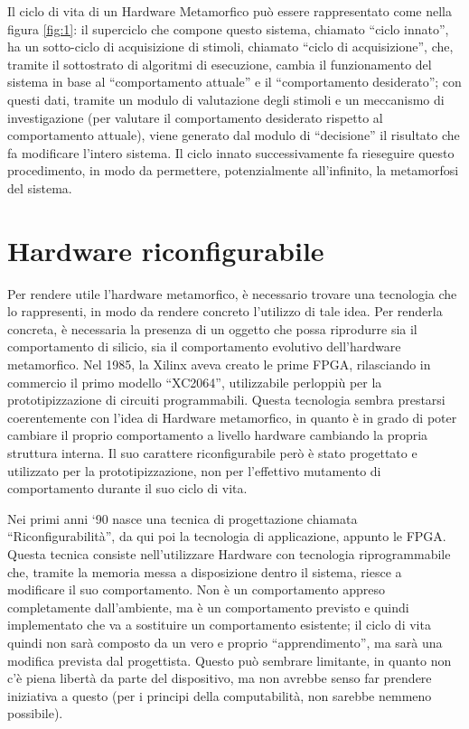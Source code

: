 \documentclass[11pt]{article} %
\begin{document}
Il ciclo di vita di un Hardware Metamorfico può essere rappresentato come nella figura \ref{fig:1}: il superciclo che compone questo sistema, chiamato ``ciclo innato'', ha un sotto-ciclo di acquisizione di stimoli, chiamato ``ciclo di acquisizione'', che, tramite il sottostrato di algoritmi di esecuzione, cambia il funzionamento del sistema in base al ``comportamento attuale'' e il ``comportamento desiderato''; con questi dati, tramite un modulo di valutazione degli stimoli e un meccanismo di investigazione (per valutare il comportamento desiderato rispetto al comportamento attuale), viene generato dal modulo di ``decisione'' il risultato che fa modificare l'intero sistema. Il ciclo innato successivamente fa rieseguire questo procedimento, in modo da permettere, potenzialmente all'infinito, la metamorfosi del sistema.

\section{Hardware riconfigurabile}

Per rendere utile l'hardware metamorfico, è necessario trovare una tecnologia che lo rappresenti, in modo da rendere concreto l'utilizzo di tale idea. Per renderla concreta, è necessaria la presenza di un oggetto che possa riprodurre sia il comportamento di silicio, sia il comportamento evolutivo dell'hardware metamorfico. Nel 1985, la Xilinx aveva creato le prime FPGA, rilasciando in commercio il primo modello ``XC2064'', utilizzabile perloppiù per la prototipizzazione di circuiti programmabili. Questa tecnologia sembra prestarsi coerentemente con l'idea di Hardware metamorfico, in quanto è in grado di poter cambiare il proprio comportamento a livello hardware cambiando la propria struttura interna. Il suo carattere riconfigurabile però è stato progettato e utilizzato per la prototipizzazione, non per l'effettivo mutamento di comportamento durante il suo ciclo di vita.

Nei primi anni `90 nasce una tecnica di progettazione chiamata ``Riconfigurabilità'', da qui poi la tecnologia di applicazione, appunto le FPGA. Questa tecnica consiste nell'utilizzare Hardware con tecnologia riprogrammabile che, tramite la memoria messa a disposizione dentro il sistema, riesce a modificare il suo comportamento. Non è un comportamento appreso completamente dall'ambiente, ma è un comportamento previsto e quindi implementato che va a sostituire un comportamento esistente; il ciclo di vita quindi non sarà composto da un vero e proprio ``apprendimento'', ma sarà una modifica prevista dal progettista. Questo può sembrare limitante, in quanto non c'è piena libertà da parte del dispositivo, ma non avrebbe senso far prendere iniziativa a questo (per i principi della computabilità, non sarebbe nemmeno possibile).
\end{document}
